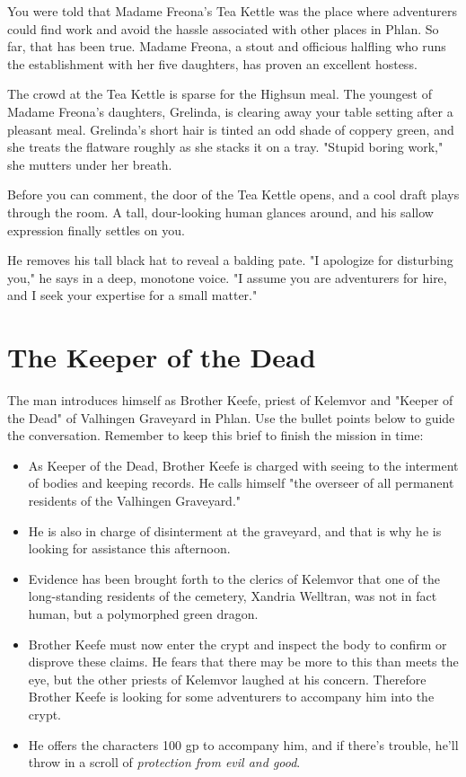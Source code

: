 \documentclass[10pt,a4paper,twoside,bg=print,twocolumn,openany,nodeprecatedcode]{dndbook}
\begin{document}
\begin{DndReadAloud}{}
You were told that Madame Freona's Tea Kettle was the place where adventurers could find work and avoid the hassle associated with other places in Phlan. So far, that has been true. Madame Freona, a stout and officious halfling who runs the establishment with her five daughters, has proven an excellent hostess.

The crowd at the Tea Kettle is sparse for the Highsun meal. The youngest of Madame Freona's daughters, Grelinda, is clearing away your table setting after a pleasant meal. Grelinda's short hair is tinted an odd shade of coppery green, and she treats the flatware roughly as she stacks it on a tray. "Stupid boring work," she mutters under her breath.

Before you can comment, the door of the Tea Kettle opens, and a cool draft plays through the room. A tall, dour-looking human glances around, and his sallow expression finally settles on you.

\end{DndReadAloud}

He removes his tall black hat to reveal a balding pate. "I apologize for disturbing you," he says in a deep, monotone voice. "I assume you are adventurers for hire, and I seek your expertise for a small matter."

\section{The Keeper of the Dead}
The man introduces himself as Brother Keefe, priest of Kelemvor and "Keeper of the Dead" of Valhingen Graveyard in Phlan. Use the bullet points below to guide the conversation. Remember to keep this brief to finish the mission in time:


\begin{itemize}
\item As Keeper of the Dead, Brother Keefe is charged with seeing to the interment of bodies and keeping records. He calls himself "the overseer of all permanent residents of the Valhingen Graveyard."
\item He is also in charge of disinterment at the graveyard, and that is why he is looking for assistance this afternoon.
\item Evidence has been brought forth to the clerics of Kelemvor that one of the long-standing residents of the cemetery, Xandria Welltran, was not in fact human, but a polymorphed green dragon.
\item Brother Keefe must now enter the crypt and inspect the body to confirm or disprove these claims. He fears that there may be more to this than meets the eye, but the other priests of Kelemvor laughed at his concern. Therefore Brother Keefe is looking for some adventurers to accompany him into the crypt.
\item He offers the characters 100 gp to accompany him, and if there's trouble, he'll throw in a scroll of \textit{protection from evil and good}.
\end{itemize}
\end{document}
